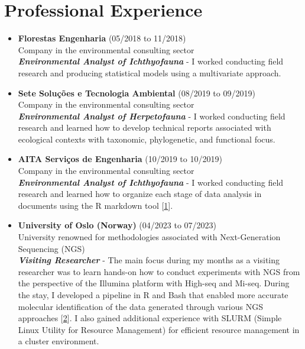 \documentclass[a4paper,10pt]{article}
\begin{document}
\section*{Professional Experience}
\begin{itemize}[left=0pt]
	\item \textbf{Florestas Engenharia} (05/2018 to 11/2018)\\
	Company in the environmental consulting sector\\
	\textbf{\textit{Environmental Analyst of Ichthyofauna}} - I worked conducting field research and producing statistical models using a multivariate approach.
	
	\item \textbf{Sete Soluções e Tecnologia Ambiental} (08/2019 to 09/2019) \\
	Company in the environmental consulting sector\\
	\textbf{\textit{Environmental Analyst of Herpetofauna}} - I worked conducting field research and learned how to develop technical reports associated with ecological contexts with taxonomic, phylogenetic, and functional focus.
	
	\item \textbf{AITA Serviços de Engenharia} (10/2019 to 10/2019)\\
	Company in the environmental consulting sector\\
	\textbf{\textit{Environmental Analyst of Ichthyofauna}} - I worked conducting field research and learned how to organize each stage of data analysis in documents using the R markdown tool [\href{https://github.com/fabricioA14/Functional_Indexes}{1}].
	
	\item \textbf{University of Oslo (Norway)} (04/2023 to 07/2023)\\
	University renowned for methodologies associated with Next-Generation Sequencing (NGS)\\
	\textbf{\textit{Visiting Researcher}} - The main focus during my months as a visiting researcher was to learn hands-on how to conduct experiments with NGS from the perspective of the Illumina platform with High-seq and Mi-seq. During the stay, I developed a pipeline in R and Bash that enabled more accurate molecular identification of the data generated through various NGS approaches [\href{https://github.com/fabricioA14/BLAST}{2}]. I also gained additional experience with SLURM (Simple Linux Utility for Resource Management) for efficient resource management in a cluster environment.
\end{itemize}
\end{document}
